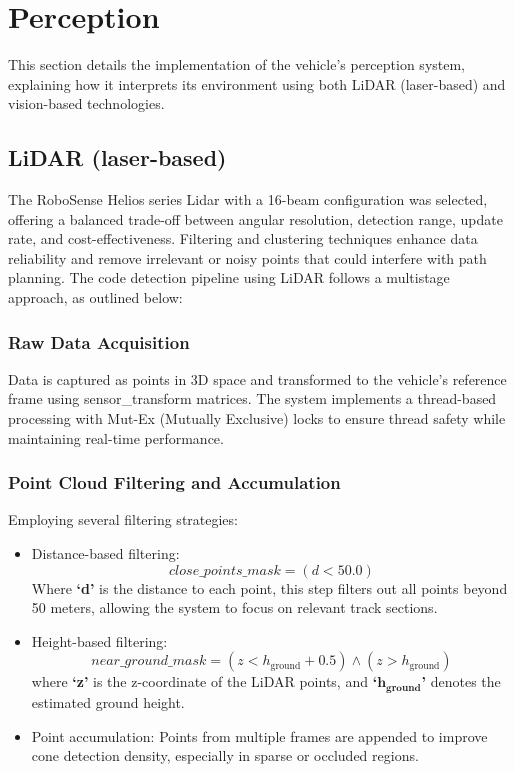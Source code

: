 \documentclass[conference]{IEEEtran}
\begin{document}
\section{Perception}
This section details the implementation of the vehicle's perception system, explaining how it interprets its environment using both LiDAR (laser-based) and vision-based technologies.

\subsection{LiDAR (laser-based)}\label{AA}
The RoboSense Helios series Lidar with a 16-beam configuration was selected, offering a balanced trade-off between angular resolution, detection range, update rate, and cost-effectiveness. Filtering and clustering techniques enhance data reliability and remove irrelevant or noisy points that could interfere with path planning. The code detection pipeline using LiDAR follows a multistage approach, as outlined below:
\subsubsection{Raw Data Acquisition}
Data is captured as points in 3D space and transformed to the vehicle's reference frame using sensor\_transform matrices. The system implements a thread-based processing with Mut-Ex (Mutually Exclusive) locks to ensure thread safety while maintaining real-time performance.
\subsubsection{Point Cloud Filtering and Accumulation}
Employing several filtering strategies:
\begin{itemize}
    \item Distance-based filtering:
    \[
    \mathit{close\_points\_mask} = \left( d < 50.0 \right)
    \]
    Where \textbf{‘d’} is the distance to each point, this step filters out all points beyond 50 meters, allowing the system to focus on relevant track sections.

    \item Height-based filtering:
    \[
    \mathit{near\_ground\_mask} = \left( z < h_{\text{ground}} + 0.5 \right) \land \left( z > h_{\text{ground}} \right)
    \]
    where \textbf{‘z’} is the z-coordinate of the LiDAR points, and \textbf{‘$\bm{h_{\text{ground}}}$’} denotes the estimated ground height.

    \item Point accumulation: Points from multiple frames are appended to improve cone detection density, especially in sparse or occluded regions.
\end{itemize}
\end{document}
